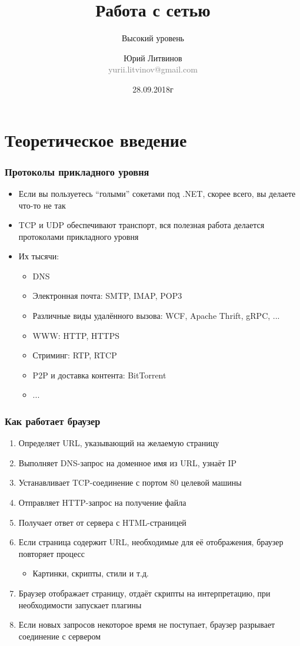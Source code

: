 \documentclass[xetex,mathserif,serif]{beamer}
\title{Работа с сетью}
\subtitle{Высокий уровень}
\author[Юрий Литвинов]{Юрий Литвинов\\\small{\textcolor{gray}{yurii.litvinov@gmail.com}}}
\date{28.09.2018г}
\begin{document}
	\frame{\titlepage}

	\section{Теоретическое введение}

	\begin{frame}
		\frametitle{Протоколы прикладного уровня}
		\begin{itemize}
			\item Если вы пользуетесь ``голыми'' сокетами под .NET, скорее всего, вы делаете что-то не так
			\item TCP и UDP обеспечивают транспорт, вся полезная работа делается протоколами прикладного уровня
			\item Их тысячи:
			\begin{itemize}
				\item DNS
				\item Электронная почта: SMTP, IMAP, POP3
				\item Различные виды удалённого вызова: WCF, Apache Thrift, gRPC, ...
				\item WWW: HTTP, HTTPS
				\item Стриминг: RTP, RTCP
				\item P2P и доставка контента: BitTorrent
				\item ...
			\end{itemize}
		\end{itemize}
	\end{frame}

	\begin{frame}
		\frametitle{Как работает браузер}
		\begin{enumerate}
			\item Определяет URL, указывающий на желаемую страницу
			\item Выполняет DNS-запрос на доменное имя из URL, узнаёт IP
			\item Устанавливает TCP-соединение с портом 80 целевой машины
			\item Отправляет HTTP-запрос на получение файла
			\item Получает ответ от сервера с HTML-страницей
			\item Если страница содержит URL, необходимые для её отображения, браузер повторяет процесс
			\begin{itemize}
				\item Картинки, скрипты, стили и т.д.
			\end{itemize}
			\item Браузер отображает страницу, отдаёт скрипты на интерпретацию, при необходимости запускает плагины
			\item Если новых запросов некоторое время не поступает, браузер разрывает соединение с сервером
		\end{enumerate}
	\end{frame}
\end{document}
